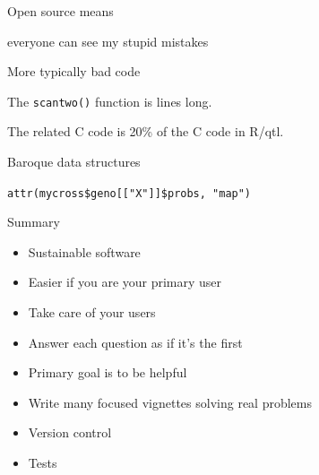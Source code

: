 \documentclass[12pt,t]{beamer}
\begin{document}
\begin{frame}[c]{}

  \large

  {\hilit Open source} {\lolit means}

  everyone can see my stupid mistakes

  \bigskip \bigskip \bigskip


\end{frame}


\begin{frame}[c]{More typically bad code}

  \large
      The {\hilit \tt scantwo()} function is { lines} long.

      \bigskip \bigskip

      The related C code is 20\% of the C code in R/qtl.


\end{frame}



\begin{frame}[c]{Baroque data structures}

  \large
      {\tt attr(mycross\$geno[["X"]]\$probs, "map")}


\end{frame}



\begin{frame}[c]{Summary}

  \begin{itemize}
  \itemsep12pt
  \item Sustainable software
    \bi
    \item Easier if you are your primary user
    \ei
  \item Take care of your users
    \bi
    \item Answer each question as if it's the first
    \item Primary goal is to be helpful
    \item Write many focused vignettes solving real problems
    \ei
  \item Version control
  \item Tests
  \end{itemize}

\end{frame}
\end{document}
